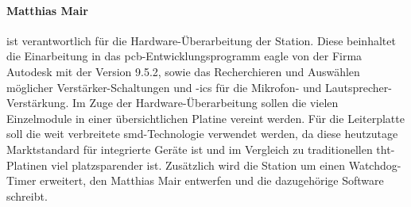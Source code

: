 \paragraph{Matthias Mair} ist verantwortlich für die Hardware-Überarbeitung der Station.
Diese beinhaltet die Einarbeitung in das \ac{pcb}-Entwicklungsprogramm \ac{eagle} von der Firma Autodesk mit der Version 9.5.2, sowie das Recherchieren und Auswählen möglicher Verstärker-Schaltungen und -\ac{ic}s für die Mikrofon- und Lautsprecher-Verstärkung.
Im Zuge der Hardware-Überarbeitung sollen die vielen Einzelmodule in einer übersichtlichen Platine vereint werden.
Für die Leiterplatte soll die weit verbreitete \ac{smd}-Technologie verwendet werden, da diese heutzutage Marktstandard für integrierte Geräte ist und im Vergleich zu traditionellen \ac{tht}-Platinen viel platzsparender ist.
Zusätzlich wird die Station um einen Watchdog-Timer erweitert, den Matthias Mair entwerfen und die dazugehörige Software schreibt.